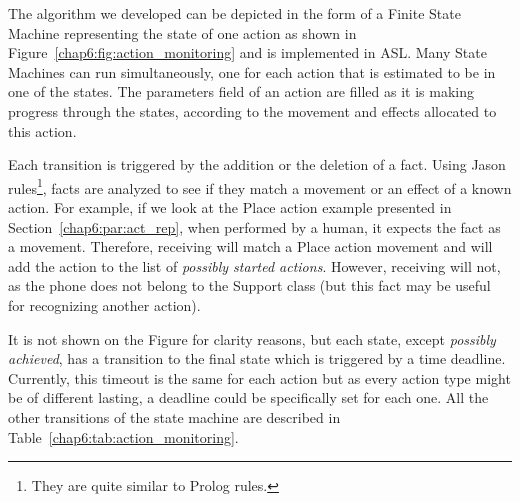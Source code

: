 \documentclass[a4paper,11pt,twoside]{StyleThese}
\begin{document}
The algorithm we developed can be depicted in the form of a Finite State Machine representing the state of one action as shown in Figure~\ref{chap6:fig:action_monitoring} and is implemented in ASL. Many State Machines can run simultaneously, one for each action that is estimated to be in one of the states. The parameters field of an action are filled as it is making progress through the states, according to the movement and effects allocated to this action.


\thispagestyle{example}

Each transition is triggered by the addition or the deletion of a fact. Using Jason rules\footnote{They are quite similar to Prolog rules.}, facts are analyzed to see if they match a movement or an effect of a known action. For example, if we look at the Place action example presented in Section~\ref{chap6:par:act_rep}, when performed by a human, it expects the fact  as a movement. Therefore, receiving  will match a Place action movement and will add the action to the list of \emph{possibly started actions}. However, receiving  will not, as the phone does not belong to the Support class (but this fact may be useful for recognizing another action).
 
It is not shown on the Figure for clarity reasons, but each state, except \emph{possibly achieved}, has a transition to the final state which is triggered by a time deadline. Currently, this timeout is the same for each action but as every action type might be of different lasting, a deadline could be specifically set for each one. All the other transitions of the state machine are described in Table~\ref{chap6:tab:action_monitoring}.


\end{document}
